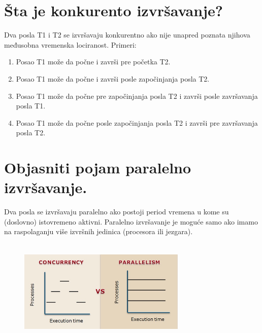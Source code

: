 \documentclass[a4paper]{article}
\begin{document}
\section{Šta je konkurento izvršavanje?}
  Dva posla T1 i T2 se izvršavaju konkurentno ako nije unapred poznata njihova međusobna 
  vremenska lociranost. Primeri:
  \begin{enumerate}
    \item Posao T1 može da počne i završi pre početka T2.
    \item Posao T1 može da počne i završi posle započinjanja posla T2.
    \item Posao T1 može da počne pre započinjanja posla T2 i završi posle završavanja posla T1.
    \item Posao T1 može da počne posle započinjanja posla T2 i završi pre završavanja posla T2.
  \end{enumerate}
  
\section{Objasniti pojam paralelno izvršavanje.}
  Dva posla se izvršavaju paralelno ako postoji period vremena u kome su (doslovno) 
  istovremeno aktivni. Paralelno izvršavanje je moguće samo ako imamo na raspolaganju
  više izvršnih jedinica (procesora ili jezgara). \\
  
  \begin{figure}[H]
    \begin{center}
        \includegraphics[width=80mm,height=50mm]{Slike/konkurencija_paralelizacija.jpg}
    \end{center}
  \end{figure}
\end{document}
